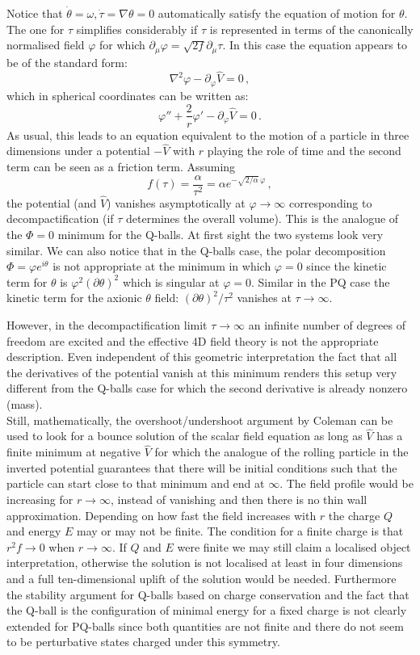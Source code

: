 \documentclass[11pt,a4paper]{article}
\newcommand{\be}{\begin{equation}}
\newcommand{\ee}{\end{equation}}
\begin{document}
Notice that $\dot{\theta}=\omega, \dot{\tau}=\nabla{\theta}=0$ automatically satisfy the equation of motion for $\theta$. The one for $\tau$  simplifies considerably if $\tau$ is represented in terms of the canonically normalised field $\varphi$ for which $\partial_\mu\varphi=\sqrt{2f} \partial_\mu \tau$. In this case the equation appears to be of the standard form:
\be
\nabla^2\varphi - \partial_\varphi \hat{V}=0 \,,
\ee
which in spherical coordinates can be written as:
\be
\varphi{''}+\frac{2}{r}\varphi{'}-\partial_\varphi \hat{V}=0 \,.
\label{eqmotion}
\ee
As usual, this leads to an equation equivalent to the motion of a particle in three dimensions under a potential $-\hat{V}$ with $r$ playing the role of time and the second term can be seen as a friction term. Assuming
\be
f(\tau)=\frac{\alpha}{\tau^2}=\alpha e^{-\sqrt{2/\alpha}\, \varphi} \,,
\ee
the potential (and  $\hat{V}$) vanishes asymptotically at $\varphi\to\infty$ corresponding to  decompactification (if $\tau$ determines the overall volume). This is the analogue of the $\Phi=0$ minimum for the Q-balls. At first sight the two systems look very similar. We can also notice that in the Q-balls case, the polar decomposition  $\Phi=\varphi e^{i\theta}$ is not appropriate at the minimum in which $\varphi=0$ since the kinetic term for $\theta$ is $\varphi^2(\partial\theta)^2$ which is singular at $\varphi=0$. Similar in the PQ case the kinetic term for the axionic $\theta$ field: $(\partial\theta)^2/\tau^2$ vanishes at $\tau\to \infty$. 

However, in the decompactification limit $\tau\to \infty$ an infinite number of degrees of freedom are excited and the effective 4D field theory is not the appropriate description. Even independent of this geometric interpretation the fact that all the derivatives of the potential vanish at this minimum renders this setup very different from the Q-balls case for which the second derivative is  already nonzero (mass).\\

Still, mathematically,  the overshoot/undershoot argument by Coleman can be used to look for a bounce solution of the scalar field equation as long as $\hat{V}$ has a finite minimum at negative $\hat{V}$ for which the analogue of the rolling particle in the inverted potential guarantees that there will be initial conditions such that the particle can start close to that minimum and end at $\infty$. The field profile would be increasing for $r\to \infty$, instead of vanishing and then there is no thin wall approximation. Depending on how fast the field increases with $r$ the charge $Q$ and energy $E$ may or may not be finite. The condition for a finite charge is that $r^2 f\to 0$ when $r\to \infty$. If $Q$ and $E$ were finite we may still claim a localised object interpretation,  otherwise the solution is not localised at least in four dimensions and a full ten-dimensional uplift of the solution would be needed. Furthermore the stability argument for Q-balls based on charge conservation and the fact that the Q-ball  is the configuration of minimal energy for a fixed charge is not clearly extended for PQ-balls since both quantities are not finite and there do not seem to be perturbative states charged under this symmetry.\\
\end{document}
